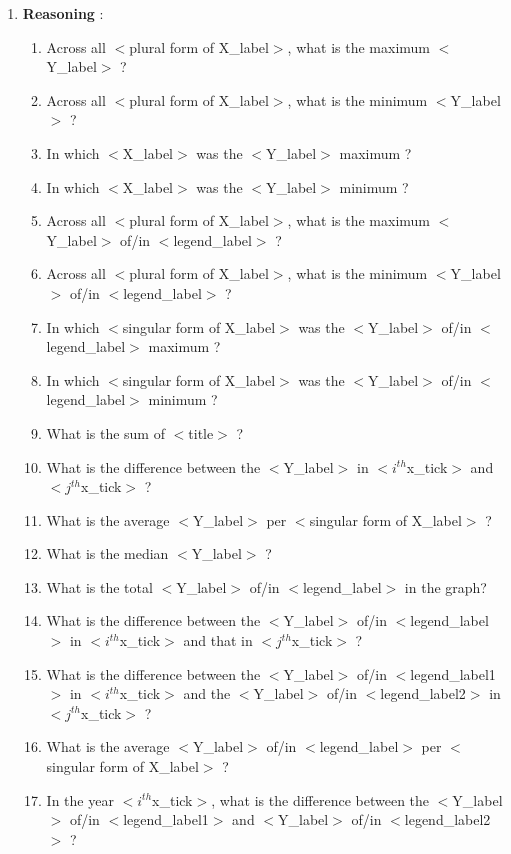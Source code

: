 \documentclass[10pt,twocolumn,letterpaper]{article}
\begin{document}
\begin{enumerate}
    \item \textbf{Reasoning} :
    \begin{enumerate}[1.]
        \item Across all $<$plural form of X\_label$>$, what is the maximum $<$Y\_label$>$ ?
        \item Across all $<$plural form of X\_label$>$, what is the minimum $<$Y\_label$>$ ?
        \item In which $<$X\_label$>$ was the $<$Y\_label$>$ maximum ?
        \item In which $<$X\_label$>$ was the $<$Y\_label$>$ minimum ?
        \item Across all $<$plural form of X\_label$>$, what is the maximum $<$Y\_label$>$ of/in $<$legend\_label$>$ ?
        \item Across all $<$plural form of X\_label$>$, what is the minimum $<$Y\_label$>$ of/in $<$legend\_label$>$ ?
        \item In which $<$singular form of X\_label$>$ was the $<$Y\_label$>$ of/in $<$legend\_label$>$ maximum ?
        \item In which $<$singular form of X\_label$>$ was the $<$Y\_label$>$ of/in $<$legend\_label$>$ minimum ?
        \item What is the sum of $<$title$>$ ?
        \item What is the difference between the $<$Y\_label$>$ in $<i^{th}$x\_tick$>$ and $<j^{th}$x\_tick$>$ ?
        \item What is the average $<$Y\_label$>$ per $<$singular form of X\_label$>$ ?
        \item What is the median $<$Y\_label$>$ ?
        \item What is the total $<$Y\_label$>$ of/in $<$legend\_label$>$ in the graph?
        \item What is the difference between the $<$Y\_label$>$ of/in $<$legend\_label$>$ in $<i^{th}$x\_tick$>$ and that in $<j^{th}$x\_tick$>$ ?
        \item What is the difference between the $<$Y\_label$>$ of/in $<$legend\_label1$>$ in $<i^{th}$x\_tick$>$ and the $<$Y\_label$>$ of/in $<$legend\_label2$>$ in $<j^{th}$x\_tick$>$ ?
        \item What is the average $<$Y\_label$>$ of/in $<$legend\_label$>$ per $<$singular form of X\_label$>$ ?
        \item In the year $<i^{th}$x\_tick$>$, what is the difference between the $<$Y\_label$>$ of/in $<$legend\_label1$>$ and $<$Y\_label$>$ of/in $<$legend\_label2$>$ ?

\end{enumerate}
\end{enumerate}
\end{document}

